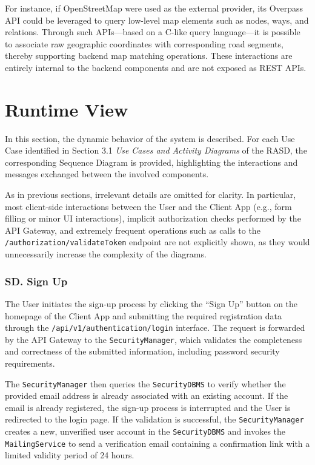 For instance, if OpenStreetMap were used as the external provider, its Overpass API could be leveraged to query low-level map elements such as nodes, ways, and relations. Through such APIs—based on a C-like query language—it is possible to associate raw geographic coordinates with corresponding road segments, thereby supporting backend map matching operations. These interactions are entirely internal to the backend components and are not exposed as REST APIs.







\newpage
\section{Runtime View}
\label{sec:runtime_view}

In this section, the dynamic behavior of the system is described. For each Use Case identified in Section 3.1 \textit{Use Cases and Activity Diagrams} of the RASD, the corresponding Sequence Diagram is provided, highlighting the interactions and messages exchanged between the involved components.

As in previous sections, irrelevant details are omitted for clarity. In particular, most client-side interactions between the User and the Client App (e.g., form filling or minor UI interactions), implicit authorization checks performed by the API Gateway, and extremely frequent operations such as calls to the \texttt{/authorization/validateToken} endpoint are not explicitly shown, as they would unnecessarily increase the complexity of the diagrams.

\setcounter{uc}{1}
\newcommand{\cuc}{\theuc{}}

\subsubsection*{SD\cuc. Sign Up}
\label{subsubsec:signup_sd}

The User initiates the sign-up process by clicking the ``Sign Up'' button on the homepage of the Client App and submitting the required registration data through the \texttt{/api/v1/authentication/login} interface. The request is forwarded by the API Gateway to the \texttt{SecurityManager}, which validates the completeness and correctness of the submitted information, including password security requirements.

The \texttt{SecurityManager} then queries the \texttt{SecurityDBMS} to verify whether the provided email address is already associated with an existing account. If the email is already registered, the sign-up process is interrupted and the User is redirected to the login page. If the validation is successful, the \texttt{SecurityManager} creates a new, unverified user account in the \texttt{SecurityDBMS} and invokes the \texttt{MailingService} to send a verification email containing a confirmation link with a limited validity period of 24 hours.

